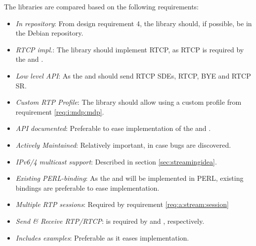 The libraries are compared based on the following requirements:
\begin{itemize}
	\item \textit{In repository}: From design requirement 4, the library should, if possible, be in the Debian repository.
	\item \textit{RTCP impl.}: The library should implement RTCP, as RTCP is required by the \pub{} and \sub{}.
	\item \textit{Low level API}: As the \pub{} and \sub{} should send RTCP SDEs, RTCP, BYE and RTCP SR.
	\item \textit{Custom RTP Profile}: The library should allow using a custom profile from requirement \ref{req:i:mdp:mdp}.
	\item \textit{API documented}: Preferable to ease implementation of the \pub{} and \sub{}.
	\item \textit{Actively Maintained}: Relatively important, in case bugs are discovered.
	\item \textit{IPv6/4 multicast support}: Described in section \ref{sec:streamingidea}.
	\item \textit{Existing PERL-binding}: As the \pub{} and \sub{} will be implemented in PERL, existing bindings are preferable to ease implementation.
	\item \textit{Multiple RTP sessions}: Required by requirement \ref{req:a:stream:session}
	\item \textit{Send \& Receive RTP/RTCP}: is required by \pub{} and \sub{}, respectively.
	\item \textit{Includes examples}: Preferable as it eases implementation.
\end{itemize}

